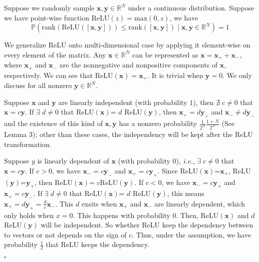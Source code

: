 \documentclass{article}
\newcommand\ie{\textit{i.e.}}
\newcommand\doubleP{\mathbb{P}}
\newenvironment{lemma}[2][Lemma]{\begin{trivlist}
		\item[\hskip \labelsep {\bfseries #1}\hskip \labelsep {\bfseries #2.}]}{\end{trivlist}}
\newenvironment{proof}{{\noindent\it Proof}\quad}{\hfill $\square$\par}
\begin{document}
\begin{lemma} 2
Suppose we  randomly sample $\bm{x}, \bm{y}\in \mathbb{R}^N$ under a continuous distribution. Suppose we have point-wise function $\text{ReLU}(z) = \text{max}(0,z)$, we have
$$\doubleP(\text{rank}\left(\text{ReLU}([\bm{x}, \bm{y}])\right) \leq \text{rank}([\bm{x}, \bm{y}]) \;|\; \bm{x}, \bm{y} \in \mathbb{R}^N) = 1$$
\end{lemma}
\begin{proof}
We generalize ReLU onto multi-dimensional case by applying it element-wise on every element of the matrix. Any $\bm{x} \in \mathbb{R}^N$ can be represented as $\bm{x} = \bm{x_+} + \bm{x_-}$, where $\bm{x_+}$ and $\bm{x_-}$ are the nonnegative and nonpositive components of $\bm{x}$, respectively. We can see that $\text{ReLU}(\bm{x}) = \bm{x}_+$. It is trivial when $\bm{y}=0$. We only discuss for all nonzero $\bm{y} \in \mathbb{R}^N$.

Suppose $\bm{x}$ and $\bm{y}$ are linearly independent (with probability $1$), then $\nexists\; c \neq 0$ that $\bm{x} = c\bm{y}$. If $\exists\; d \neq 0$ that ReLU$(\bm{x})$= $d$ ReLU$(\bm{y})$, then $\bm{x_+} = d \bm{y_+} $ and $\bm{x_-} \neq d \bm{y_-}$ and the existence of this kind of $\bm{x},\bm{y}$ has a nonzero probability $\frac{1}{2^N} \frac{1+N}{2^N}$ (See Lemma 3); other than these cases, the independency will be kept after the ReLU transformation. %

Suppose $y$ is linearly dependent of $\bm{x}$ (with probability 0), \ie{}, $\exists\; c \neq 0$ that $\bm{x} = c \bm{y}$. If $c>0$, we have $\bm{x_-} = c \bm{y_-}$ and $ \bm{x_+} = c \bm{y_+}$. Since ReLU$(\bm{x})$=$\bm{x_+}$, ReLU$(\bm{y})$=$\bm{y_+}$, then ReLU$(\bm{x})$= $c$ReLU$(\bm{y})$. If $c<0$, we have $\bm{x_-} = c \bm{y_+}$ and $ \bm{x_+} = c \bm{y_-}$. If $\exists\; d \neq 0$ that ReLU$(\bm{x})$= $d$ ReLU$(\bm{y})$, this means $\bm{x_+} = d \bm{y_+} = \frac{d}{c} \bm{x_-}$. This $d$ exsits when $\bm{x_+} $ and $\bm{x_-}$ are linearly dependent, which only holds when $x=0$. This happens with probability 0. Then, ReLU$(\bm{x})$ and $d$ ReLU$(\bm{y})$ will be independent. So whether ReLU keep the dependency between to vectors or not depends on the sign of $c$. Thus, under the assumption, we have probability $\frac{1}{2}$ that ReLU keeps the dependency.


\end{proof}
\end{document}
